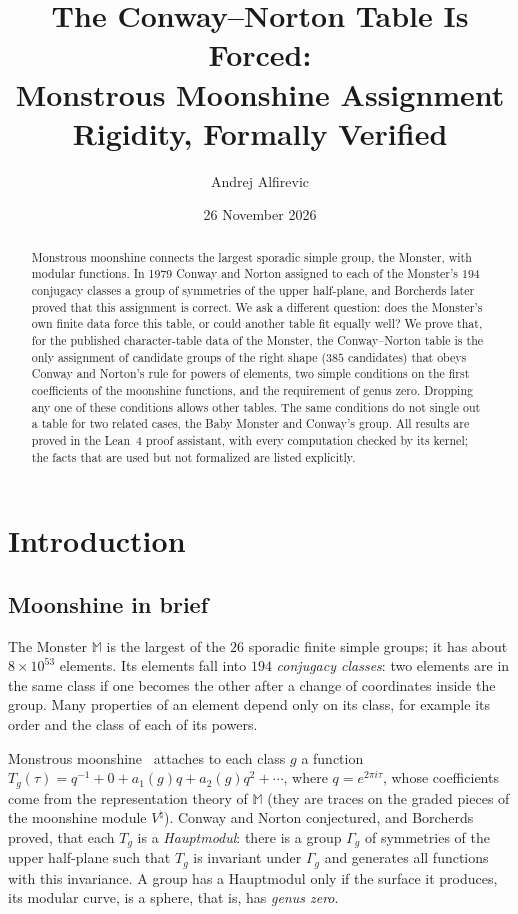 \documentclass[11pt]{amsart}
\title[The Conway--Norton table is forced]{The Conway--Norton Table Is Forced:\\ Monstrous Moonshine Assignment\\ Rigidity, Formally Verified}
\author{Andrej Alfirevic}
\date{26 November 2026}
\theoremstyle{definition}
\newcommand{\M}{\mathbb{M}}
\begin{document}
\begin{abstract}
Monstrous moonshine connects the largest sporadic simple group, the Monster, with modular functions. In 1979 Conway and Norton assigned to each of the Monster's $194$ conjugacy classes a group of symmetries of the upper half-plane, and Borcherds later proved that this assignment is correct. We ask a different question: does the Monster's own finite data force this table, or could another table fit equally well? We prove that, for the published character-table data of the Monster, the Conway--Norton table is the only assignment of candidate groups of the right shape ($385$ candidates) that obeys Conway and Norton's rule for powers of elements, two simple conditions on the first coefficients of the moonshine functions, and the requirement of genus zero. Dropping any one of these conditions allows other tables. The same conditions do not single out a table for two related cases, the Baby Monster and Conway's group. All results are proved in the Lean~4 proof assistant, with every computation checked by its kernel; the facts that are used but not formalized are listed explicitly.
\end{abstract}

\maketitle

\section{Introduction}

\subsection{Moonshine in brief}
The Monster $\M$ is the largest of the $26$ sporadic finite simple groups; it has about $8\times10^{53}$ elements. Its elements fall into $194$ \emph{conjugacy classes}: two elements are in the same class if one becomes the other after a change of coordinates inside the group. Many properties of an element depend only on its class, for example its order and the class of each of its powers.

Monstrous moonshine~\cite{CN79,Bo92} attaches to each class $g$ a function $T_g(\tau)=q^{-1}+0+a_1(g)q+a_2(g)q^2+\cdots$, where $q=e^{2\pi i\tau}$, whose coefficients come from the representation theory of $\M$ (they are traces on the graded pieces of the moonshine module $V^\natural$). Conway and Norton conjectured, and Borcherds proved, that each $T_g$ is a \emph{Hauptmodul}: there is a group $\Gamma_g$ of symmetries of the upper half-plane such that $T_g$ is invariant under $\Gamma_g$ and generates all functions with this invariance. A group has a Hauptmodul only if the surface it produces, its modular curve, is a sphere, that is, has \emph{genus zero}.
\end{document}
